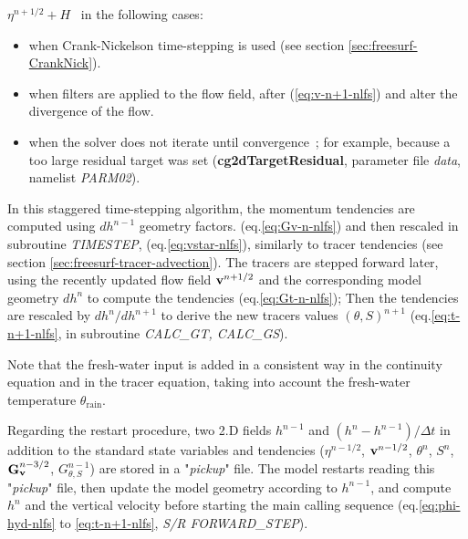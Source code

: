 $\eta^{n+1/2} + H$~ in the following cases:
\begin{itemize}
\item when Crank-Nickelson time-stepping is used (see section
\ref{sec:freesurf-CrankNick}).
\item when filters are applied to the flow field, after
(\ref{eq:v-n+1-nlfs}) and alter the divergence of the flow.
\item when the solver does not iterate until convergence~;
 for example, because a too large residual target was set
 ({\bf cg2dTargetResidual}, parameter file {\em data}, namelist
 {\em PARM02}).
\end{itemize}\noindent
In this staggered time-stepping algorithm, the momentum tendencies
are computed using $dh^{n-1}$ geometry factors.
(eq.\ref{eq:Gv-n-nlfs}) and then rescaled in subroutine {\it TIMESTEP},
(eq.\ref{eq:vstar-nlfs}), similarly to tracer tendencies (see section
\ref{sec:freesurf-tracer-advection}).
The tracers are stepped forward later, using the recently updated
flow field ${\bf v}^{n+1/2}$ and the corresponding model geometry
$dh^{n}$ to compute the tendencies (eq.\ref{eq:Gt-n-nlfs});
Then the tendencies are rescaled by $dh^n/dh^{n+1}$ to derive
the new tracers values $(\theta,S)^{n+1}$ (eq.\ref{eq:t-n+1-nlfs},
in subroutine {\em CALC\_GT, CALC\_GS}).

Note that the fresh-water input is added in a consistent way in the
continuity equation and in the tracer equation, taking into account
the fresh-water temperature $\theta_{\mathrm{rain}}$.

Regarding the restart procedure,
two 2.D fields $h^{n-1}$ and $(h^n-h^{n-1})/\Delta t$
in addition to the standard
state variables and tendencies ($\eta^{n-1/2}$, ${\bf v}^{n-1/2}$,
$\theta^n$, $S^n$, ${\bf G}_{\bf v}^{n-3/2}$, $G_{\theta,S}^{n-1}$)
are stored in a "{\em pickup}" file.
The model restarts reading this "{\em pickup}" file,
then update the model geometry according to $h^{n-1}$,
and compute $h^n$ and the vertical velocity
before starting the main calling sequence (eq.\ref{eq:phi-hyd-nlfs}
to \ref{eq:t-n+1-nlfs}, {\em S/R FORWARD\_STEP}).
\\


